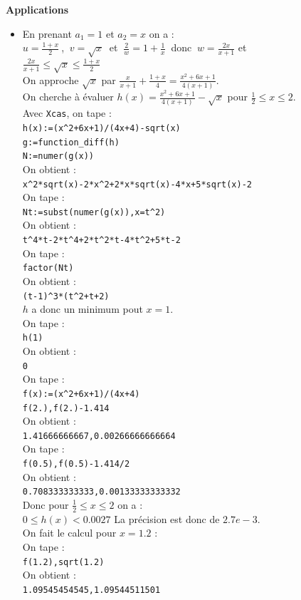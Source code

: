 \documentclass[a4paper,11pt]{book}
\begin{document}
{\bf Applications}
\begin{itemize}
\item
En prenant $a_1=1$ et $a_2=x$ on a :\\
$\displaystyle u=\frac{1+x}{2}\ $, $\ v=\sqrt x\ $ et $\ \displaystyle \frac{2}{w}=1+\frac{1}{x}\ $ donc
$\ \displaystyle w=\frac{2x}{x+1}$ et\\
$\displaystyle \frac{2x}{x+1}\leq \sqrt x \leq \frac{1+x}{2}$\\
On approche $\sqrt x$ par $\displaystyle \frac{x}{x+1}+\frac{1+x}{4}=\frac{x^2+6x+1}{4(x+1)}$.\\
On cherche \`a \'evaluer $\displaystyle h(x)=\frac{x^2+6x+1}{4(x+1)}-\sqrt x$ 
pour $\displaystyle \frac{1}{2}\leq x\leq 2$.\\
Avec {\tt Xcas}, on tape :\\
{\tt h(x):=(x\verb|^|2+6x+1)/(4x+4)-sqrt(x)}\\
{\tt g:=function\_diff(h)}\\
{\tt N:=numer(g(x))}\\
On obtient :\\
{\tt x\verb|^|2*sqrt(x)-2*x\verb|^|2+2*x*sqrt(x)-4*x+5*sqrt(x)-2}\\
On tape :\\
{\tt Nt:=subst(numer(g(x)),x=t\verb|^|2)}\\
On obtient :\\
{\tt t\verb|^|4*t-2*t\verb|^|4+2*t\verb|^|2*t-4*t\verb|^|2+5*t-2}\\
On tape :\\
{\tt factor(Nt)}\\
On obtient :\\
{\tt (t-1)\verb|^|3*(t\verb|^|2+t+2)}\\
$h$ a donc un minimum pout $x=1$.\\
On tape :\\
{\tt h(1)}\\
On obtient :\\
{\tt 0}\\
On tape :\\
{\tt f(x):=(x\verb|^|2+6x+1)/(4x+4)}\\
{\tt f(2.),f(2.)-1.414}\\
On obtient :\\
{\tt 1.41666666667,0.00266666666664}\\
On tape :\\
{\tt f(0.5),f(0.5)-1.414/2}\\
On obtient :\\
{\tt 0.708333333333,0.00133333333332}\\
Donc pour $\frac{1}{2}\leq x\leq 2$ on a :\\
$0\leq h(x)<0.0027$
La pr\'ecision est donc de $2.7e-3$.\\
On fait le calcul pour $x=1.2$ :\\
On tape :\\
{\tt f(1.2),sqrt(1.2)}\\
On obtient :\\
{\tt 1.09545454545,1.09544511501}


\end{itemize}
\end{document}
